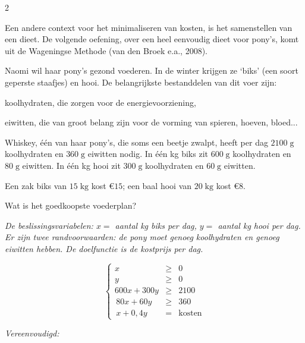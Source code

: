 \begin{multicols}{2}
    
    Een andere context voor het minimaliseren van kosten, is het samenstellen van een dieet. De volgende oefening, over een heel eenvoudig dieet voor pony's, komt uit de Wageningse Methode (van den Broek e.a., 2008).
    
    \end{multicols}
    
 
    Naomi wil haar pony's gezond voederen. In de winter krijgen ze `biks' (een soort geperste staafjes) en hooi. De belangrijkste bestanddelen van dit voer 
    zijn:
    
    \begin{opsomming}
    \item koolhydraten, die zorgen voor de energievoorziening, 
    \item eiwitten,  die  van  groot  belang  zijn  voor de vorming van 
    spieren, hoeven, bloed...   
    \end{opsomming}
    
    Whiskey, één van haar pony's, die soms een beetje zwalpt, heeft per dag $2100\; \mathrm{g}$ koolhydraten  en  $360 
    \; \mathrm{g}$ eiwitten nodig. In één kg biks zit $600\; \mathrm{g}$ koolhydraten en $80 \; \mathrm{g}$ eiwitten. In één kg hooi zit $300\; \mathrm{g}$ koolhydraten en $60\; \mathrm{g}$ eiwitten. 
    
    Een zak biks van $15 \; \mathrm{kg}$ kost  $\euro 15$; een baal hooi van $20 \; \mathrm{kg}$ 
    kost  $\euro 8$. 
    
    Wat is het goedkoopste voederplan?
    
    \emph{De beslissingsvariabelen: $x=$ aantal kg biks per dag, $y=$ aantal kg hooi per dag. Er zijn twee randvoorwaarden: de pony moet genoeg koolhydraten en genoeg eiwitten hebben. De doelfunctie is de kostprijs per dag.}
    
    $$
    \left\{
    \begin{array}{rcl}
         x &\ge &0\\
         y &\ge &0\\
    	 600x+300y &\ge  &2100 \\
    	 \, 80x+60y&\ge  &360 \\
    	 \, x+0,4y&=&\mathrm{kosten}
    \end{array}
    \right.
    $$
    
    \emph{Vereenvoudigd:}
    
